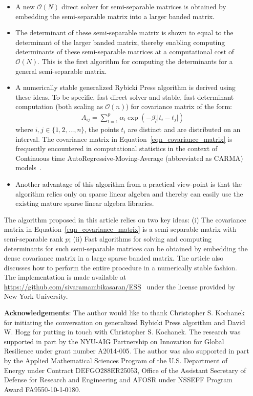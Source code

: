 \documentclass[final,leqno]{siamltex}
\begin{document}
\begin{itemize}
\item
A new $\mathcal{O}(N)$ direct solver for semi-separable matrices is obtained by embedding the semi-separable matrix into a larger banded matrix.
\item
The determinant of these semi-separable matrix is shown to equal to the determinant of the larger banded matrix, thereby enabling computing determinants of these semi-separable matrices at a computational cost of $\mathcal{O}(N)$. This is the first algorithm for computing the determinants for a general semi-separable matrix.
\item
A numerically stable generalized Rybicki Press algorithm is derived using these ideas. To be specific, fast direct solver and stable, fast determinant computation (both scaling as $\mathcal{O}(n)$) for covariance matrix of the form:
\begin{align}
A_{ij} = \sum_{l=1}^p \alpha_l \exp\left(-\beta_l \vert t_i - t_j \vert\right)
\label{eqn_covariance_matrix}
\end{align}
where $i,j \in \{1,2,\ldots,n\}$, the points $t_i$ are distinct and are distributed on an interval. The covariance matrix in Equation~\eqref{eqn_covariance_matrix} is frequently encountered in computational statistics in the context of Continuous time AutoRegressive-Moving-Average (abbreviated as CARMA) models~\cite{brockwell2002introduction, brockwell2001levy, brockwell1994continuous}.
\item
Another advantage of this algorithm from a practical view-point is that the algorithm relies only on sparse linear algebra and thereby can easily use the existing mature sparse linear algebra libraries.
\end{itemize}

The algorithm proposed in this article relies on two key ideas: (i) The covariance matrix in Equation~\eqref{eqn_covariance_matrix} is a semi-separable matrix with semi-separable rank $p$; (ii) Fast algorithms for solving and computing determinants for such semi-separable matrices can be obtained by embedding the dense covariance matrix in a large sparse banded matrix. The article also discusses how to perform the entire procedure in a numerically stable fashion. The implementation is made available at \url{https://github.com/sivaramambikasaran/ESS}~\cite{ambikasaran2014ESS} under the license provided by New York University.

\textbf{Acknowledgements}: The author would like to thank Christopher S. Kochanek for initiating the conversation on generalized Rybicki Press algorithm and David W. Hogg for putting in touch with Christopher S. Kochanek. The research was supported in part by the NYU-AIG Partnership on Innovation for Global Resilience under grant number A2014-005. The author was also supported in part by the Applied Mathematical Sciences Program of the U.S. Department of Energy under Contract DEFGO288ER25053, Office of the Assistant Secretary of Defense for Research and Engineering and AFOSR under NSSEFF Program Award FA9550-10-1-0180.
\end{document}
